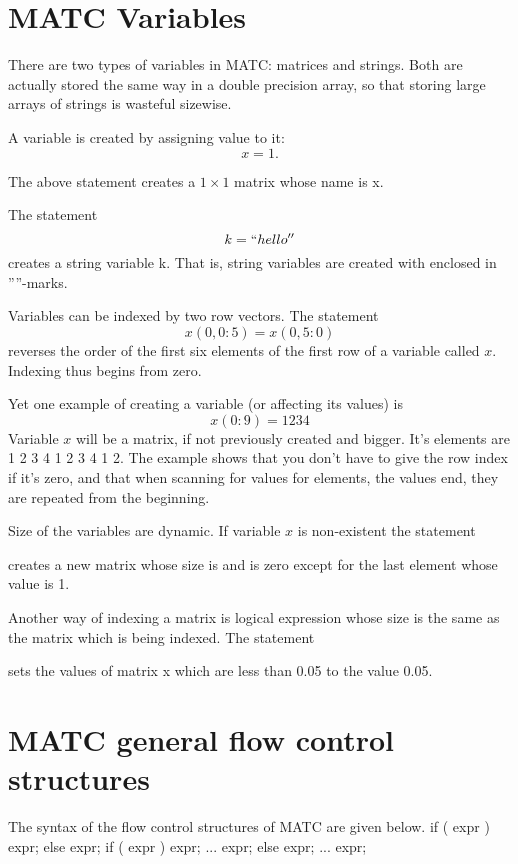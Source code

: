 \section{MATC Variables}

There are two types of variables in MATC: matrices and strings. 
Both are actually stored the same way in a double precision array, so that storing large arrays of strings is wasteful sizewise. 

A variable is created by assigning value to it: 
\[
  x = 1. 
\]
 
The above statement creates a $1 \times 1$ matrix whose name is x. 

The statement 
\[
  k = ``hello''
\]
 creates a  string variable k. That is, string variables are created with enclosed in ''''-marks. 

Variables can be indexed by two row vectors. The statement 
\[
   x(0,0:5) = x(0,5:0)
\]
reverses the order of the first six elements of the first row of a variable called $x$. 
Indexing thus begins from zero. 

Yet one example of creating a variable (or affecting its values) is 
\[
  x(0:9) = 1 2 3 4
\]
 Variable $x$ will be a  matrix, if not previously created and bigger. 
It's elements are 1 2 3 4 1 2 3 4 1 2.
The example shows that you don't have to give the row index if it's zero, and that when scanning for values for elements, the values end, they are repeated from the beginning. 

Size of the variables are dynamic. If variable $x$ is non-existent the statement 

 

creates a new matrix whose size is  and is zero except for the last element whose value is 1. 

Another way of indexing a matrix is logical expression whose size is the same as the matrix which is being indexed. The statement 

 

sets the values of matrix x which are less than 0.05 to the value 0.05. 



\section{MATC general flow control structures}

The syntax of the flow control structures of MATC are given below. 
\ttbegin
if ( expr ) expr; else expr;
if ( expr )
{
    expr;
    ...
    expr;
} else {
    expr;
    ...
    expr;
}

